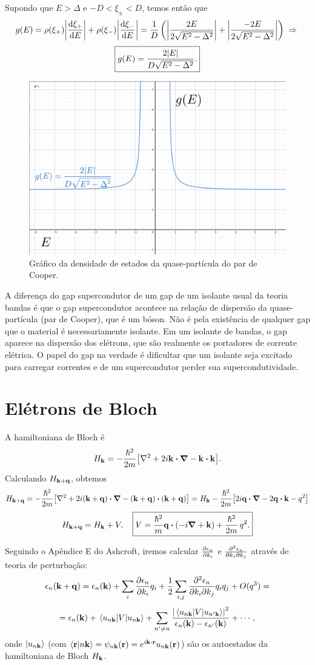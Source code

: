 \documentclass[a4paper,10pt]{article}
\begin{document}
Supondo que $E > \Delta$ e $-D < \xi_\pm < D$, temos então que
$$
g(E) = \rho(\xi_+) \abs{\dv{\xi_+}{E}} + \rho(\xi_-) \abs{\dv{\xi_-}{E}} =
\frac{1}{D} \, \qty(\abs{\frac{2E}{2\sqrt{E^2-\Delta^2}}} + \abs{\frac{-2E}{2\sqrt{E^2-\Delta^2}}}) \; \Rightarrow \;
$$
$$
\boxed{ g(E) = \frac{2 \abs{E}}{D \sqrt{E^2 - \Delta^2}}. }
$$
\begin{figure}[H]
\centering
\includegraphics[width=0.6\linewidth]{fig/bcs.png}
\caption{Gráfico da densidade de estados da quase-partícula do par de Cooper.}
\label{fig:bcs}
\end{figure}

A diferença do gap supercondutor de um gap de um isolante usual da teoria bandas é que o gap supercondutor acontece na relação de dispersão da quase-partícula (par de Cooper), que é um bóson. Não é pela existência de qualquer gap que o material é necessariamente isolante. Em um isolante de bandas, o gap aparece na dispersão dos elétrons, que são realmente os portadores de corrente elétrica. O papel do gap na verdade é dificultar que um isolante seja excitado para carregar correntes e de um supercondutor perder sua supercondutividade.


\pagebreak

\section{Elétrons de Bloch}

A hamiltoniana de Bloch é
$$
H_{\k} = -\frac{\hbar^2}{2m} \qty[\laplacian + 2i \k \vdot \grad - \k \vdot \k].
$$
Calculando $H_{\vb{k} + \vb{q}}$, obtemos
$$
H_{\k + \q} = -\frac{\hbar^2}{2m} \qty[\laplacian + 2i (\k + \q) \vdot \grad - (\k + \q) \vdot (\k + \q)] =
H_{\k} - \frac{\hbar^2}{2m} \qty[2 i \q \vdot \grad - 2 \q \vdot \k - q^2]
$$
$$
H_{\k + \q} = H_{\k} + V, \quad \boxed{V = \frac{\hbar^2}{m} \q \vdot \qty(-i \grad + \k) + \frac{\hbar^2}{2m} \, q^2.}
$$

Seguindo o Apêndice E do Ashcroft, iremos calcular $\pdv{\epsilon_n}{k_i}$ e $\pdv{\epsilon_n}{k_i}{k_j}$ através de teoria de perturbação:
$$
\epsilon_n(\vb{k}+\vb{q}) = \epsilon_n(\vb{k}) + \sum_{i} \pdv{\epsilon_n}{k_i} q_i +
\frac{1}{2} \sum_{i,j} \pdv{\epsilon_n}{k_i}{k_j} q_i q_j + O(q^3) =
$$
$$
= \eps_n(\k) + \ev{V}{u_{n\k}} + \sum_{n' \neq n} \frac{\abs{\mel{u_{n\k}}{V}{u_{n'\k}}}^2}{\eps_n(\k) - \eps_{n'}(\k)} + \cdots,
$$
onde $\ket{u_{n\vb{k}}}$ (com $\braket{\r}{n\k} = \psi_{n\k}(\r) = e^{i\k\vdot\r} u_{n\k}(\r)$) são os autoestados da hamiltoniana de Bloch $H_{\vb{k}}$.
\end{document}
